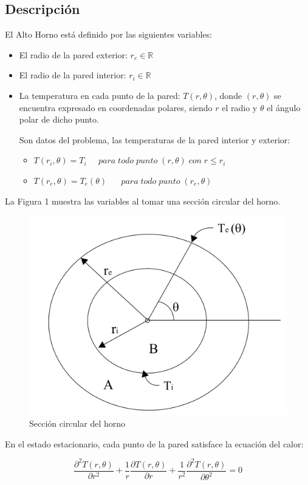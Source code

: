 \subsection{Descripción}

El Alto Horno está definido por las siguientes variables:
\begin{itemize}
    \item El radio de la pared exterior: $r_e \in \mathbb{R}$
    \item El radio de la pared interior: $r_i \in \mathbb{R}$
    \item La temperatura en cada punto de la pared:  $T(r,\theta)$, donde $(r,\theta)$ se encuentra expresado en coordenadas polares, siendo $r$ el radio y $\theta$ el \'angulo polar de dicho punto.

    Son datos del problema, las temperaturas de la pared interior y exterior:
    \begin{itemize}
        \item $T(r_i,\theta) = T_i \;\;\;\;\;para\;todo\;punto\;(r,\theta)\;con\;r\leq r_i$
        \item $T(r_e,\theta) = T_e(\theta) \;\;\;\;\;\;para\;todo\;punto\;(r_e,\theta)$
    \end{itemize}
\end{itemize}

La Figura 1 muestra las variables al tomar una sección circular del horno.

\begin{figure}[ht]
\begin{center}
\includegraphics[width=0.6\columnwidth]{imagenes/horno.png}
\caption{Secci\'on circular del horno}
\end{center}
\end{figure}

En el estado estacionario, cada punto de la pared satisface la ecuación del calor:

\begin{equation}\label{calor}
\frac{\partial^2T(r,\theta)}{\partial r^2}+\frac{1}{r}\frac{\partial T(r,\theta)}{\partial r}+\frac{1}{r^2}\frac{\partial^2T(r,\theta)}{\partial \theta^2} = 0
\end{equation}


